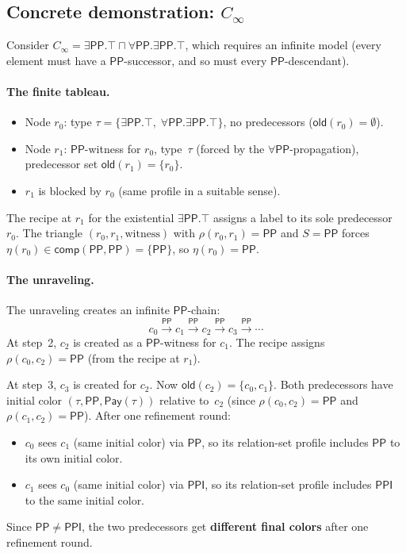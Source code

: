 \documentclass[a4paper,11pt]{article}
\theoremstyle{definition}
\newcommand{\PP}{\ensuremath{\mathsf{PP}}}
\newcommand{\PPI}{\ensuremath{\mathsf{PPI}}}
\newcommand{\comp}{\ensuremath{\mathsf{comp}}}
\newcommand{\Pay}{\ensuremath{\mathsf{Pay}}}
\newcommand{\old}{\ensuremath{\mathsf{old}}}
\begin{document}
\subsection{Concrete demonstration: $C_\infty$}

Consider $C_\infty = \exists\PP.\top \sqcap
\forall\PP.\exists\PP.\top$, which requires an infinite model (every
element must have a $\PP$-successor, and so must every
$\PP$-descendant).

\paragraph{The finite tableau.}
\begin{itemize}[nosep]
\item Node $r_0$: type $\tau = \{\exists\PP.\top,\;
  \forall\PP.\exists\PP.\top\}$, no predecessors ($\old(r_0) =
  \emptyset$).
\item Node $r_1$: $\PP$-witness for $r_0$, type~$\tau$ (forced by the
  $\forall\PP$-propagation), predecessor set $\old(r_1) = \{r_0\}$.
\item $r_1$ is blocked by $r_0$ (same profile in a suitable sense).
\end{itemize}
The recipe at $r_1$ for the existential $\exists\PP.\top$ assigns a
label to its sole predecessor~$r_0$.  The triangle $(r_0, r_1,
\text{witness})$ with $\rho(r_0, r_1) = \PP$ and $S = \PP$ forces
$\eta(r_0) \in \comp(\PP, \PP) = \{\PP\}$, so $\eta(r_0) = \PP$.

\paragraph{The unraveling.}
The unraveling creates an infinite $\PP$-chain:
\[
  c_0 \xrightarrow{\PP} c_1 \xrightarrow{\PP} c_2
  \xrightarrow{\PP} c_3 \xrightarrow{\PP} \cdots
\]
At step~2, $c_2$ is created as a $\PP$-witness for $c_1$.  The recipe
assigns $\rho(c_0, c_2) = \PP$ (from the recipe at $r_1$).

At step~3, $c_3$ is created for $c_2$.  Now $\old(c_2) = \{c_0,
c_1\}$.  Both predecessors have initial color
$(\tau, \PP, \Pay(\tau))$ relative to~$c_2$ (since $\rho(c_0, c_2) =
\PP$ and $\rho(c_1, c_2) = \PP$).  After one refinement round:
\begin{itemize}[nosep]
\item $c_0$ sees $c_1$ (same initial color) via $\PP$, so its
  relation-set profile includes $\PP$ to its own initial color.
\item $c_1$ sees $c_0$ (same initial color) via $\PPI$, so its
  relation-set profile includes $\PPI$ to the same initial color.
\end{itemize}
Since $\PP \neq \PPI$, the two predecessors get \textbf{different
final colors} after one refinement round.
\end{document}
